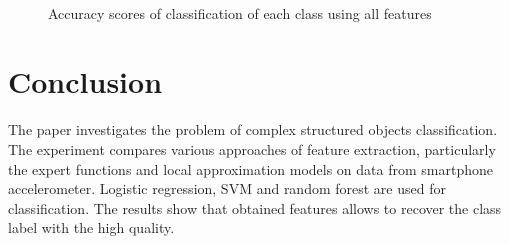 \documentclass{llncs}
\begin{document}
\begin{figure}[!ht]
	\\
	\caption{Accuracy scores of classification of each class using all features}
	\label{fig::feature_union_results}
\end{figure}

\section{Conclusion}

The paper investigates the problem of complex structured objects classification.
The experiment compares various approaches of feature extraction, particularly the expert functions and local approximation models on data from smartphone accelerometer.
Logistic regression, SVM and random forest are used for classification. 
The results show that obtained features allows to recover the class label with the high quality.


\end{document}
